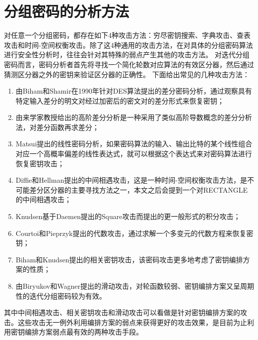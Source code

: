 \section{分组密码的分析方法}
对任意一个分组密码，都存在如下4种攻击方法：穷尽密钥搜索、字典攻击、查表攻击和时间-空间权衡攻击。除了这4种通用的攻击方法，在对具体的分组密码算法进行安全性分析时，往往会针对其特殊的弱点产生其他的攻击方法。
对迭代分组密码而言，密码分析者首先将寻找一个简化轮数对应算法的有效区分器，然后通过猜测区分器之外的密钥来验证区分器的正确性。
下面给出常见的几种攻击方法：
\begin{enumerate}
    \item 由Biham和Shamir在1990年针对DES算法提出的差分密码分析\cite{biham1991differential}，通过观察具有特定输入差分的明文对经过加密后的密文对的差分形式来恢复密钥；
    \item 由来学家教授给出的高阶差分分析\cite{lai1994higher}是一种采用了类似高阶导数概念的差分分析法，对差分函数再求差分；
    \item Matsui提出的线性密码分析\cite{matsui1993linear}，如果密码算法的输入、输出比特的某个线性组合对应一个高概率偏差的线性表达式，就可以根据这个表达式来对密码算法进行恢复密钥攻击；
    \item Diffie和Hellman提出的中间相遇攻击\cite{diffie1977special}，这是一种时间-空间权衡攻击方法，是不可能差分区分器的主要寻找方法之一，本文之后会提到一个对RECTANGLE的中间相遇攻击；
    \item Knudsen基于Daemen提出的Square攻击\cite{daemen1997block}而提出的更一般形式的积分攻击\cite{knudsen2002integral}；
    \item Courtoi和Pieprzyk提出的代数攻击\cite{courtois2002cryptanalysis}，通过求解一个多变元的代数方程来恢复密钥；
    \item Biham和Knudsen提出的相关密钥攻击\cite{biham1994new}，该密码攻击更多地考虑了密钥编排方案的性质；
    \item 由Biryukov和Wagner提出的滑动攻击\cite{biryukov1999slide}，对轮函数较弱、密钥编排方案又呈周期性的迭代分组密码较为有效。
\end{enumerate}

其中中间相遇攻击、相关密钥攻击和滑动攻击可以看做是针对密钥编排方案的攻击。这些攻击无一例外利用编排方案的弱点来获得更好的攻击效果，是目前为止利用密钥编排方案弱点最有效的两种攻击手段。
